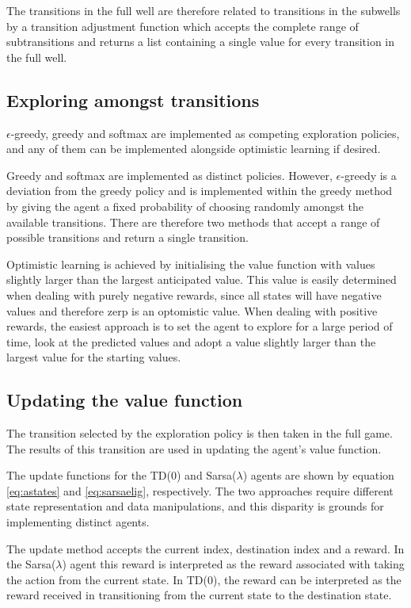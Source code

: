 \documentclass{rucsthesis}
\begin{document}
The transitions in the full well are therefore related to transitions in the subwells by a transition adjustment function which accepts the complete range of subtransitions and returns a list containing a single value for every transition in the full well.

\subsection{Exploring amongst transitions}

$\epsilon$-greedy, greedy and softmax are implemented as competing exploration policies, and any of them can be implemented alongside optimistic learning if desired.

Greedy and softmax are implemented as distinct policies. However, $\epsilon$-greedy is a deviation from the greedy policy and is implemented within the greedy method by giving the agent a fixed probability of choosing randomly amongst the available transitions. There are therefore two methods that accept a range of possible transitions and return a single transition.

Optimistic learning is achieved by initialising the value function with values slightly larger than the largest anticipated value. This value is easily determined when dealing with purely negative rewards, since all states will have negative values and therefore zerp is an optomistic value. When dealing with positive rewards, the easiest approach is to set the agent to explore for a large period of time, look at the predicted values and adopt a value slightly larger than the largest value for the starting values.

\subsection{Updating the value function}

The transition selected by the exploration policy is then taken in the full game. The results of this transition are used in updating the agent's value function.

The update functions for the TD(0) and Sarsa($\lambda$) agents are shown by equation \ref{eq:astates} and \ref{eq:sarsaelig}, respectively. The two approaches require different state representation and data manipulations, and this disparity is grounds for implementing distinct agents. 

The update method accepts the current index, destination index and a reward. In the Sarsa($\lambda$) agent this reward is interpreted as the reward associated with taking the action from the current state. In TD(0), the reward can be interpreted as the reward received in transitioning from the current state to the destination state.
\end{document}
